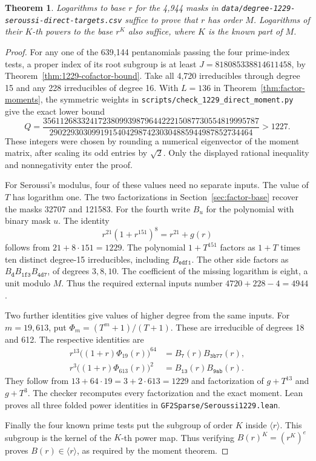 \documentclass[11pt]{article}
\newtheorem{theorem}{Theorem}
\begin{document}
\begin{theorem}
Logarithms to base \(r\) for the 4,944 masks in
\nolinkurl{data/degree-1229-seroussi-direct-targets.csv} suffice to
prove that \(r\) has order \(M\). Logarithms of their \(K\)-th powers
to the base \(r^K\) also suffice, where \(K\) is the known part of \(M\).
\end{theorem}
\begin{proof}
For any one of the 639,144 pentanomials passing the four prime-index
tests, a proper index of its root subgroup is at least
\(J=818085338814611458\), by Theorem~\ref{thm:1229-cofactor-bound}.
Take all 4,720 irreducibles through degree 15 and any 228 irreducibles
of degree 16. With \(L=136\) in Theorem~\ref{thm:factor-moments},
the symmetric weights in \nolinkurl{scripts/check_1229_direct_moment.py}
give the exact lower bound
\[
 Q=\frac{356112683324172380993987964422215087730554819995787}
          {290229303099191540429874230304885944987852734464}
   >1227.
\]
These integers were chosen by rounding a numerical eigenvector of the
moment matrix, after scaling its odd entries by \(\sqrt2\). Only the
displayed rational inequality and nonnegativity enter the proof.

For Seroussi's modulus, four of these values need no separate inputs.
The value of \(T\) has logarithm one. The two factorizations in
Section~\ref{sec:factor-base} recover the masks 32707 and 121583.
For the fourth write \(B_u\) for the polynomial with binary mask \(u\).
The identity
\[
               r^{21}(1+r^{151})^8=r^{21}+g(r)
\]
follows from \(21+8\cdot151=1229\). The polynomial \(1+T^{151}\)
factors as \(1+T\) times ten distinct degree-15 irreducibles, including
\(B_{\mathtt{edf1}}\). The other side factors as
\( B_{\mathtt d}B_{\mathtt{1f3}}B_{\mathtt{4d7}}\), of degrees
\(3,8,10\). The coefficient of the missing logarithm is eight,
a unit modulo \(M\). Thus the required external inputs number
\(4720+228-4=4944\).

Two further identities give values of higher degree from the same inputs.
For \(m=19,613\), put \(\Phi_m=(T^m+1)/(T+1)\). These are
irreducible of degrees 18 and 612. The respective identities are
\[
 \begin{aligned}
 r^{13}\big((1+r)\Phi_{19}(r)\big)^{64}
     &=B_{\mathtt{7}}(r)B_{\mathtt{3b77}}(r),\\
 r^3\big((1+r)\Phi_{613}(r)\big)^2
     &=B_{\mathtt{13}}(r)B_{\mathtt{9ab}}(r).
 \end{aligned}
\]
They follow from \(13+64\cdot19=3+2\cdot613=1229\) and factorization
of \(g+T^{13}\) and \(g+T^3\). The checker recomputes every factorization
and the exact moment. Lean proves all three folded power identities in
\nolinkurl{GF2Sparse/Seroussi1229.lean}.

Finally the four known prime tests put the subgroup of order \(K\) inside
\(\langle r\rangle\). This subgroup is the kernel of the \(K\)-th power
map. Thus verifying \(B(r)^K=(r^K)^e\) proves \(B(r)\in\langle r\rangle\),
as required by the moment theorem.
\end{proof}
\end{document}
